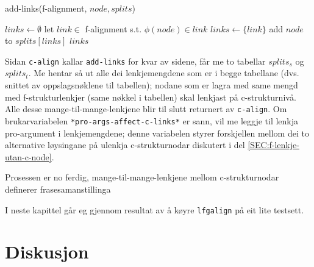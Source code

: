 \documentclass[11pt,a4paper,oneside,draft]{report}
\begin{document}
   \begin{algorithm}[]
   \caption{add-links(f-alignment, $node, splits$)}
   \label{algo:add-links}
      
        $links \gets \emptyset$\;
    {
        {
          let $link \in$ f-alignment s.t. $\phi(node) \in link$ \;
           {$links \gets \{link\}$} \;
           {
          }
        }
        add $node$ to $splits[links]$ \;
       }
        \Return $links$ \;
  \end{algorithm}

Sidan \texttt{c-align} kallar \texttt{add-links} for kvar av sidene, får me to
tabellar $splits_s$ og $splits_t$.  Me hentar så ut alle dei
lenkjemengdene som er i begge tabellane (dvs. snittet av
oppslagsnøklene til tabellen); nodane som er lagra med same mengd med
f-strukturlenkjer (same nøkkel i tabellen) skal lenkjast på
c-strukturnivå. Alle desse mange-til-mange-lenkjene blir til slutt
returnert av \texttt{c-align}. Om brukarvariabelen
\texttt{*pro-args-affect-c-links*} er sann, vil me leggje til lenkja
pro-argument i lenkjemengdene; denne variabelen styrer forskjellen
mellom dei to alternative løysingane på ulenkja c-strukturnodar
diskutert i del \ref{SEC:f-lenkje-utan-c-node}.

Prosessen er no ferdig, mange-til-mange-lenkjene mellom
c-strukturnodar definerer frasesamanstillinga

I neste kapittel går eg gjennom resultat av å køyre \texttt{lfgalign} på eit
lite testsett. 


\chapter{Diskusjon}
\label{sec-5}

\label{SEC:diskusjon}

\end{document}
